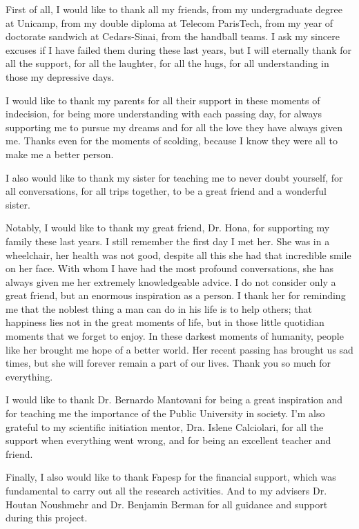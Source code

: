 

First of all, I would like to thank all my friends, from my undergraduate degree at Unicamp, from my double diploma at Telecom ParisTech, from my year of doctorate sandwich at Cedars-Sinai, from the handball teams. I ask my sincere excuses if I have failed them during these last years, but I will eternally thank for all the support, for all the laughter, for all the hugs, for all understanding in those my depressive days.

I would like to thank my parents for all their support in these moments of indecision, for being more understanding with each passing day, for always supporting me to pursue my dreams and for all the love they have always given me. Thanks even for the moments of scolding, because I know they were all to make me a better person.

I also would like to thank my sister for teaching me to never doubt yourself,
for all conversations, for all trips together, to be a great friend and a wonderful sister.

Notably, I would like to thank my great friend, Dr. Hona, for supporting my family these last years.
I still remember the first day I met her. She was in a wheelchair, her health was not good, despite all this she had that incredible smile on her face. With whom I have had the most  profound conversations, she has always given me her extremely knowledgeable advice. I do not consider only a great friend, but an enormous inspiration as a person. I thank her for reminding me that the noblest thing a man can do in his life is to help others; that happiness lies not in the great moments of life, but in those little quotidian moments that we forget to enjoy. In these darkest moments of humanity, people like her brought me hope of a better world. Her recent passing has brought us sad times, but she will forever remain a part of our lives. Thank you so much for everything.

I would like to thank  Dr. Bernardo Mantovani for being a great inspiration and for teaching me the importance of the Public University in society. I'm also grateful to my scientific initiation mentor, Dra. Islene Calciolari, for all the support when everything went wrong, and for being an excellent teacher and friend.

Finally, I also would like to thank Fapesp for the financial support,
which was fundamental to carry out all the research activities.
And to my advisers Dr. Houtan Noushmehr and Dr. Benjamin Berman
for all guidance and support during this project.\\
